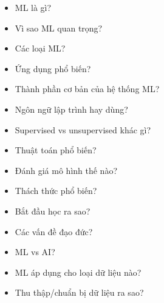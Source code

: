 \begin{phuongphap}[title={Một số câu hỏi tiêu biểu}]
\begin{itemize}
  \item ML là gì?
  \item Vì sao ML quan trọng?
  \item Các loại ML?
  \item Ứng dụng phổ biến?
  \item Thành phần cơ bản của hệ thống ML?
  \item Ngôn ngữ lập trình hay dùng?
  \item Supervised vs unsupervised khác gì?
  \item Thuật toán phổ biến?
  \item Đánh giá mô hình thế nào?
  \item Thách thức phổ biến?
  \item Bắt đầu học ra sao?
  \item Các vấn đề đạo đức?
  \item ML vs AI?
  \item ML áp dụng cho loại dữ liệu nào?
  \item Thu thập/chuẩn bị dữ liệu ra sao?
\end{itemize}
\end{phuongphap}

